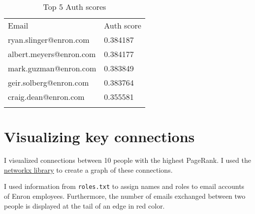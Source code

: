 \documentclass{tufte-handout}
\begin{document}
\begin{longtable}[c]{@{}ll@{}}
\toprule\addlinespace
\begin{minipage}[b]{0.34\columnwidth}\raggedright
Email
\end{minipage} & \begin{minipage}[b]{0.17\columnwidth}\raggedright
Auth score
\end{minipage}
\\\addlinespace
\midrule\endhead
\begin{minipage}[t]{0.34\columnwidth}\raggedright
ryan.slinger@enron.com
\end{minipage} & \begin{minipage}[t]{0.17\columnwidth}\raggedright
0.384187
\end{minipage}
\\\addlinespace
\begin{minipage}[t]{0.34\columnwidth}\raggedright
albert.meyers@enron.com
\end{minipage} & \begin{minipage}[t]{0.17\columnwidth}\raggedright
0.384177
\end{minipage}
\\\addlinespace
\begin{minipage}[t]{0.34\columnwidth}\raggedright
mark.guzman@enron.com
\end{minipage} & \begin{minipage}[t]{0.17\columnwidth}\raggedright
0.383849
\end{minipage}
\\\addlinespace
\begin{minipage}[t]{0.34\columnwidth}\raggedright
geir.solberg@enron.com
\end{minipage} & \begin{minipage}[t]{0.17\columnwidth}\raggedright
0.383764
\end{minipage}
\\\addlinespace
\begin{minipage}[t]{0.34\columnwidth}\raggedright
craig.dean@enron.com
\end{minipage} & \begin{minipage}[t]{0.17\columnwidth}\raggedright
0.355581
\end{minipage}
\\\addlinespace
\bottomrule
\addlinespace
\caption{Top 5 Auth scores}
\end{longtable}

\section{Visualizing key connections}\label{visualizing-key-connections}

I visualized connections between 10 people with the highest PageRank. I
used the \href{https://networkx.github.io}{networkx library} to create a
graph of these connections.

I used information from \texttt{roles.txt} to assign names and roles to
email accounts of Enron employees. Furthermore, the number of emails
exchanged between two people is displayed at the tail of an edge in red
color.
\end{document}
